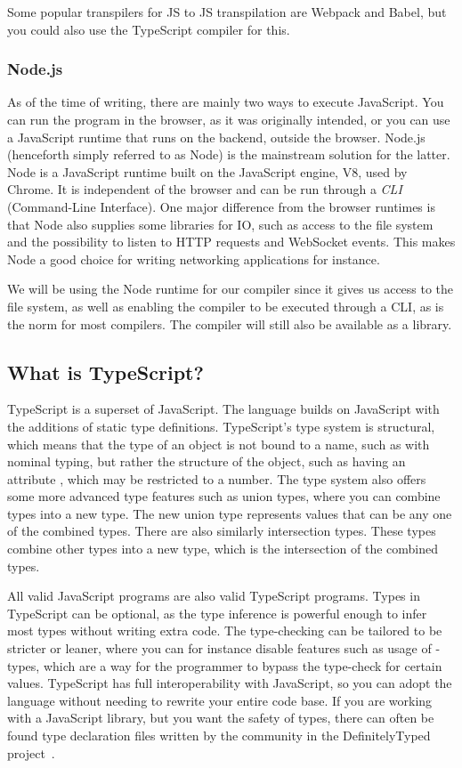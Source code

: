 Some popular transpilers for JS to JS transpilation are Webpack and Babel, but you could also use the TypeScript compiler for this.

\subsubsection{Node.js}\label{subsubsec:node}

As of the time of writing, there are mainly two ways to execute JavaScript.
You can run the program in the browser, as it was originally intended, or you can use a JavaScript runtime that runs on the backend, outside the browser.
Node.js (henceforth simply referred to as Node) is the mainstream solution for the latter.
Node is a JavaScript runtime built on the JavaScript engine, V8, used by Chrome.
It is independent of the browser and can be run through a \textit{CLI} (Command-Line Interface).
One major difference from the browser runtimes is that Node also supplies some libraries for IO, such as access to the file system and the possibility to listen to HTTP requests and WebSocket events.
This makes Node a good choice for writing networking applications for instance.

We will be using the Node runtime for our compiler since it gives us access to the file system, as well as enabling the compiler to be executed through a CLI, as is the norm for most compilers.
The compiler will still also be available as a library.

\subsection{What is TypeScript?}\label{subsec:what-is-typescript}

TypeScript is a superset of JavaScript.
The language builds on JavaScript with the additions of static type definitions.
TypeScript's type system is structural, which means that the type of an object is not bound to a name, such as with nominal typing, but rather the structure of the object, such as having an attribute , which may be restricted to a number.
The type system also offers some more advanced type features such as union types, where you can combine types into a new type.
The new union type represents values that can be any one of the combined types.
There are also similarly intersection types.
These types combine other types into a new type, which is the intersection of the combined types.

All valid JavaScript programs are also valid TypeScript programs.
Types in TypeScript can be optional, as the type inference is powerful enough to infer most types without writing extra code.
The type-checking can be tailored to be stricter or leaner, where you can for instance disable features such as usage of -types, which are a way for the programmer to bypass the type-check for certain values.
TypeScript has full interoperability with JavaScript, so you can adopt the language without needing to rewrite your entire code base.
If you are working with a JavaScript library, but you want the safety of types, there can often be found type declaration files written by the community in the DefinitelyTyped project~\cite{tswebsite}.

